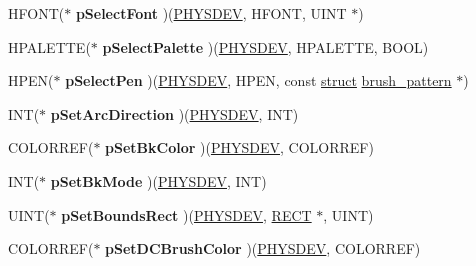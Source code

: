 \begin{DoxyCompactItemize}
H\+F\+O\+NT($\ast$ {\bfseries p\+Select\+Font} )(\hyperlink{structgdi__physdev}{P\+H\+Y\+S\+D\+EV}, H\+F\+O\+NT, U\+I\+NT $\ast$)
\item 
\mbox{\label{structgdi__dc__funcs_afe97079e9f5228e1e7c5dae11d1eb1ee}} 
H\+P\+A\+L\+E\+T\+TE($\ast$ {\bfseries p\+Select\+Palette} )(\hyperlink{structgdi__physdev}{P\+H\+Y\+S\+D\+EV}, H\+P\+A\+L\+E\+T\+TE, B\+O\+OL)
\item 
\mbox{\label{structgdi__dc__funcs_a3b8e4c7d638346d0213307140f86169d}} 
H\+P\+EN($\ast$ {\bfseries p\+Select\+Pen} )(\hyperlink{structgdi__physdev}{P\+H\+Y\+S\+D\+EV}, H\+P\+EN, const \hyperlink{interfacestruct}{struct} \hyperlink{structbrush__pattern}{brush\+\_\+pattern} $\ast$)
\item 
\mbox{\label{structgdi__dc__funcs_acc98205d7debe387550cb2345a14a2d1}} 
I\+NT($\ast$ {\bfseries p\+Set\+Arc\+Direction} )(\hyperlink{structgdi__physdev}{P\+H\+Y\+S\+D\+EV}, I\+NT)
\item 
\mbox{\label{structgdi__dc__funcs_a86e19817e1bf1fc71d8cc01e9899c212}} 
C\+O\+L\+O\+R\+R\+EF($\ast$ {\bfseries p\+Set\+Bk\+Color} )(\hyperlink{structgdi__physdev}{P\+H\+Y\+S\+D\+EV}, C\+O\+L\+O\+R\+R\+EF)
\item 
\mbox{\label{structgdi__dc__funcs_ac5b35ceee9078e48c12157cb7fa26bc5}} 
I\+NT($\ast$ {\bfseries p\+Set\+Bk\+Mode} )(\hyperlink{structgdi__physdev}{P\+H\+Y\+S\+D\+EV}, I\+NT)
\item 
\mbox{\label{structgdi__dc__funcs_ab1efd6738487de28f752dd0a1fa043ad}} 
U\+I\+NT($\ast$ {\bfseries p\+Set\+Bounds\+Rect} )(\hyperlink{structgdi__physdev}{P\+H\+Y\+S\+D\+EV}, \hyperlink{structtag_r_e_c_t}{R\+E\+CT} $\ast$, U\+I\+NT)
\item 
\mbox{\label{structgdi__dc__funcs_a82bcf05e2579070e82a62397bd942e72}} 
C\+O\+L\+O\+R\+R\+EF($\ast$ {\bfseries p\+Set\+D\+C\+Brush\+Color} )(\hyperlink{structgdi__physdev}{P\+H\+Y\+S\+D\+EV}, C\+O\+L\+O\+R\+R\+EF)
\item 
\mbox{\label{structgdi__dc__funcs_a02feb3594a9e8962483091d49b4f2f4a}} 

\end{DoxyCompactItemize}
